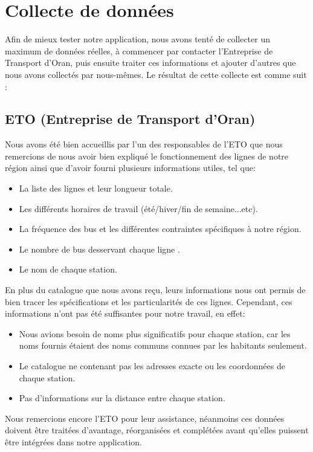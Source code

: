 \section{Collecte de données}
Afin de mieux tester notre application, nous avons tenté de collecter un maximum de données réelles, à commencer par contacter l'Entreprise de Transport d'Oran, puis ensuite traiter ces informations et ajouter d'autres que nous avons collectés par nous-mêmes.
Le résultat de cette collecte est comme suit :

\subsection{ETO (Entreprise de Transport d'Oran)}

Nous avons été bien accueillis par l'un des responsables de l'ETO que nous remercions de nous avoir bien expliqué le fonctionnement des lignes de notre région ainsi que d'avoir fourni plusieurs informations utiles, tel que:
\begin{itemize}
	\item La liste des lignes et leur longueur totale.
	\item Les différents horaires de travail (été/hiver/fin de semaine...etc).
	\item La fréquence des bus et les différentes contraintes spécifiques à notre région.
	\item Le nombre de bus desservant chaque ligne .
	\item Le nom de chaque station.
\end{itemize}

En plus du catalogue que nous avons reçu, leurs informations nous ont permis de bien tracer les spécifications et les particularités de ces lignes.
Cependant, ces informations n'ont pas été suffisantes pour notre travail, en effet:
	\begin{itemize}
	\item Nous avions besoin de noms plus significatifs pour chaque station, car les noms fournis étaient des noms communs connues par les habitants seulement.
	\item Le catalogue ne contenant pas les adresses exacte ou les coordonnées de chaque station.
	\item Pas d'informations sur la distance entre chaque station.
	\end{itemize}
	
Nous remercions encore l'ETO pour leur assistance, néanmoins ces données doivent être traitées d'avantage, réorganisées et complétées avant qu'elles puissent être intégrées dans notre application.

